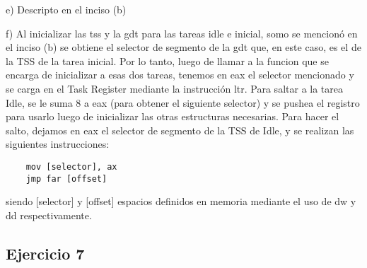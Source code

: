 \documentclass[a4paper]{article}
\begin{document}
e) Descripto en el inciso (b)

f) Al inicializar las tss y la gdt para las tareas idle e inicial, somo se mencionó en el inciso (b) se obtiene el selector de segmento de la gdt que, en este caso, es el de
la TSS de la tarea inicial. Por lo tanto, luego de llamar a la funcion que se encarga de inicializar a esas dos tareas, tenemos en eax el selector mencionado y se carga en el Task Register mediante la instrucción ltr.
Para saltar a la tarea Idle, se le suma 8 a eax (para obtener el siguiente selector) y se pushea el registro
para usarlo luego de inicializar las otras estructuras necesarias. Para hacer el salto, dejamos en eax el selector de segmento de la TSS de Idle, y se realizan las siguientes instrucciones:
\begin{verbatim}
	mov [selector], ax
	jmp far [offset]
\end{verbatim}
siendo [selector] y [offset] espacios definidos en memoria mediante el uso de dw y dd respectivamente.

\subsection{Ejercicio 7}
\end{document}
